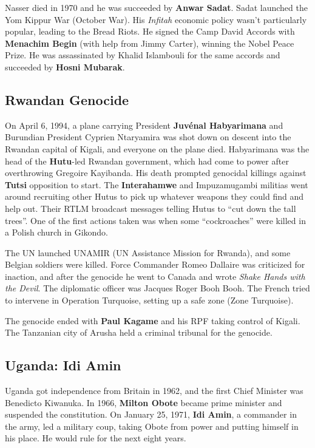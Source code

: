 Nasser died in 1970 and he was succeeded by \textbf{Anwar Sadat}.
Sadat launched the Yom Kippur War (October War).
His \textit{Infitah} economic policy wasn't particularly popular, leading to the Bread Riots.
He signed the Camp David Accords with \textbf{Menachim Begin} (with help from Jimmy Carter),
winning the Nobel Peace Prize.
He was assassinated by Khalid Islambouli for the same accords and succeeded by \textbf{Hosni Mubarak}.

\subsection*{Rwandan Genocide}

On April 6, 1994,
a plane carrying President \textbf{Juv\'enal Habyarimana} and Burundian President Cyprien Ntaryamira
was shot down on descent into the Rwandan capital of Kigali, and everyone on the plane died.
Habyarimana was the head of the \textbf{Hutu}-led Rwandan government,
which had come to power after overthrowing Gregoire Kayibanda.
His death prompted genocidal killings against \textbf{Tutsi} opposition to start.
The \textbf{Interahamwe} and Impuzamugambi militias
went around recruiting other Hutus to pick up whatever weapons they could find and help out.
Their RTLM broadcast messages telling Hutus to ``cut down the tall trees''.
One of the first actions taken was when some ``cockroaches'' were killed in a Polish church in Gikondo.

The UN launched UNAMIR (UN Assistance Mission for Rwanda), and some Belgian soldiers were killed.
Force Commander Romeo Dallaire was criticized for inaction,
and after the genocide he went to Canada and wrote \textit{Shake Hands with the Devil}.
The diplomatic officer was Jacques Roger Booh Booh.
The French tried to intervene in Operation Turquoise, setting up a safe zone (Zone Turquoise).

The genocide ended with \textbf{Paul Kagame} and his RPF taking control of Kigali.
The Tanzanian city of Arusha held a criminal tribunal for the genocide.

\subsection*{Uganda: Idi Amin}

Uganda got independence from Britain in 1962, and the first Chief Minister was Benedicto Kiwanuka.
In 1966, \textbf{Milton Obote} became prime minister and suspended the constitution.
On January 25, 1971, \textbf{Idi Amin}, a commander in the army, led a military coup,
taking Obote from power and putting himself in his place.
He would rule for the next eight years.

